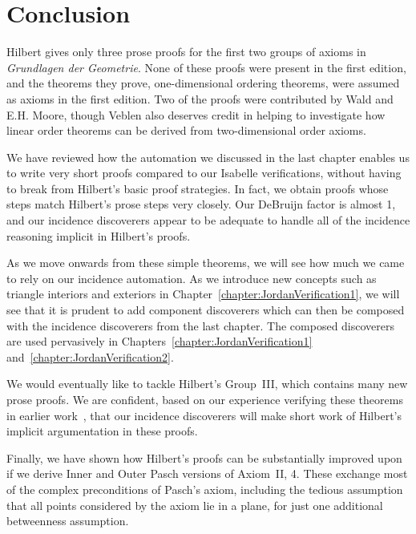 \section{Conclusion}
Hilbert gives only three prose proofs for the first two groups of axioms in \emph{Grundlagen der Geometrie}. None of these proofs were present in the first edition, and the theorems they prove, one-dimensional ordering theorems, were assumed as axioms in the first edition. Two of the proofs were contributed by Wald and E.H. Moore, though Veblen also deserves credit in helping to investigate how linear order theorems can be derived from  two-dimensional order axioms.

We have reviewed how the automation we discussed in the last chapter enables us to write very short proofs compared to our Isabelle verifications, without having to break from Hilbert's basic proof strategies. In fact, we obtain proofs whose steps match Hilbert's prose steps very closely. Our DeBruijn factor is almost 1, and our incidence discoverers appear to be adequate to handle all of the incidence reasoning implicit in Hilbert's proofs.

As we move onwards from these simple theorems, we will see how much we came to rely on our incidence automation. As we introduce new concepts such as triangle interiors and exteriors in Chapter~\ref{chapter:JordanVerification1}, we will see that it is prudent to add component discoverers which can then be composed with the incidence discoverers from the last chapter. The composed discoverers are used pervasively in Chapters~\ref{chapter:JordanVerification1} and~\ref{chapter:JordanVerification2}. 

We would eventually like to tackle Hilbert's Group~III, which contains many new prose proofs. We are confident, based on our experience verifying these theorems in earlier work~\cite{ScottMScThesis}, that our incidence discoverers will make short work of Hilbert's implicit argumentation in these proofs.

Finally, we have shown how Hilbert's proofs can be substantially improved upon if we derive Inner and Outer Pasch versions of Axiom~II, 4. These exchange most of the complex preconditions of Pasch's axiom, including the tedious assumption that all points considered by the axiom lie in a plane, for just one additional betweenness assumption.


